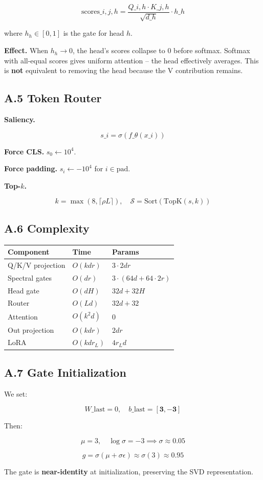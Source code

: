 \[
\text{scores}\_{i, j, h} = \frac{Q\_{i, h} \cdot K\_{j, h}}{\sqrt{d\_h}} \cdot h\_h
\tag{A.8}
\]

where $h_h \in [0, 1]$ is the gate for head $h$.

\textbf{Effect.} When $h_h \to 0$, the head's scores collapse to 0 before softmax. 
Softmax with all-equal scores gives uniform attention -- the head 
effectively averages. This is \textbf{not} equivalent to removing the head 
because the V contribution remains.

\subsection{A.5 Token Router}

\textbf{Saliency.}

\[
s\_i = \sigma(f\_\theta(x\_i))
\tag{A.9}
\]

\textbf{Force CLS.} $s_0 \leftarrow 10^4$.

\textbf{Force padding.} $s_i \leftarrow -10^4$ for $i \in \text{pad}$.

\textbf{Top-$k$.}

\[
k = \max(8, \lceil \rho L \rceil), \quad
\mathcal{S} = \text{Sort}(\text{TopK}(s, k))
\tag{A.10}
\]

\subsection{A.6 Complexity}

\begin{table}[H]
\centering
\small
\begin{tabular}{lll}
\toprule
\textbf{Component} & \textbf{Time} & \textbf{Params} \\
\midrule
Q/K/V projection & $O(k d r)$ & $3 \cdot 2 d r$ \\
Spectral gates & $O(d r)$ & $3 \cdot (64d + 64 \cdot 2r)$ \\
Head gate & $O(d H)$ & $32d + 32H$ \\
Router & $O(L d)$ & $32d + 32$ \\
Attention & $O(k^2 d)$ & 0 \\
Out projection & $O(k d r)$ & $2 d r$ \\
LoRA & $O(k d r_L)$ & $4 r_L d$ \\
\bottomrule
\end{tabular}
\end{table}

\subsection{A.7 Gate Initialization}

We set:

\[
W\_\text{last} = 0, \quad b\_\text{last} = [\mathbf{3}, \mathbf{-3}]
\tag{A.11}
\]

Then:

\[
\mu = 3, \quad \log \sigma = -3 \implies \sigma \approx 0.05
\tag{A.12}
\]

\[
g = \sigma(\mu + \sigma \epsilon) \approx \sigma(3) \approx 0.95
\tag{A.13}
\]

The gate is \textbf{near-identity} at initialization, preserving the SVD 
representation.

